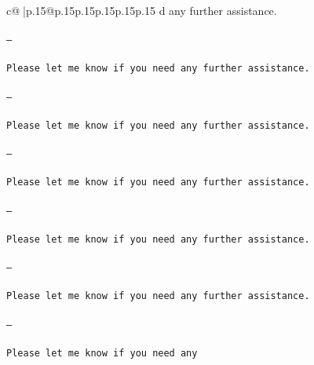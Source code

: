 \documentclass{article}
\begin{document}
{\begin{supertabular}{c@{$\;$}|p{.15\linewidth}@{}p{.15\linewidth}p{.15\linewidth}p{.15\linewidth}p{.15\linewidth}p{.15\linewidth}}
{{{d any further assistance. \\ \tt \\ \tt ---\\ \tt \\ \tt Please let me know if you need any further assistance. \\ \tt \\ \tt ---\\ \tt \\ \tt Please let me know if you need any further assistance. \\ \tt \\ \tt ---\\ \tt \\ \tt Please let me know if you need any further assistance. \\ \tt \\ \tt ---\\ \tt \\ \tt Please let me know if you need any further assistance. \\ \tt \\ \tt ---\\ \tt \\ \tt Please let me know if you need any further assistance. \\ \tt \\ \tt ---\\ \tt \\ \tt Please let me know if you need any}}}
\end{supertabular}}
\end{document}

